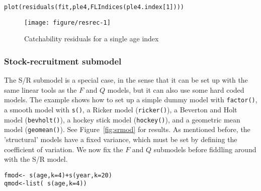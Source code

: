 \documentclass[a4paper,english,10pt]{article}\usepackage[]{graphicx}\usepackage[]{color}
\makeatletter
\def\maxwidth{ %
  \ifdim\Gin@nat@width>\linewidth
    \linewidth
  \else
    \Gin@nat@width
  \fi
}
\newcommand{\hlnum}[1]{\textcolor[rgb]{0.2,0.2,0.2}{#1}}%
\newcommand{\hlopt}[1]{\textcolor[rgb]{0.2,0.2,0.2}{#1}}%
\newcommand{\hlstd}[1]{\textcolor[rgb]{0,0,0}{#1}}%
\newcommand{\hlkwb}[1]{\textcolor[rgb]{0.361,0.506,0.596}{#1}}%
\newcommand{\hlkwc}[1]{\textcolor[rgb]{0.361,0.506,0.596}{#1}}%
\newcommand{\hlkwd}[1]{\textcolor[rgb]{0.361,0.506,0.596}{#1}}%
\newenvironment{kframe}{%
 \def\at@end@of@kframe{}%
 \ifinner\ifhmode%
  \def\at@end@of@kframe{\end{minipage}}%
  \begin{minipage}{\columnwidth}%
 \fi\fi%
 \def\FrameCommand##1{\hskip\@totalleftmargin \hskip-\fboxsep
 \colorbox{shadecolor}{##1}\hskip-\fboxsep
     \hskip-\linewidth \hskip-\@totalleftmargin \hskip\columnwidth}%
 \MakeFramed {\advance\hsize-\width
   \@totalleftmargin\z@ \linewidth\hsize
   \@setminipage}}%
 {\par\unskip\endMakeFramed%
 \at@end@of@kframe}
\newenvironment{knitrout}{}{} %
\newcommand{\code}[1]{{\texttt{#1}}}
\makeatother
\begin{document}
\begin{knitrout}
\color{fgcolor}\begin{kframe}
\begin{alltt}
\hlkwd{plot}\hlstd{(}\hlkwd{residuals}\hlstd{(fit, ple4,} \hlkwd{FLIndices}\hlstd{(ple4.index[}\hlnum{1}\hlstd{])))}
\end{alltt}
\end{kframe}\begin{figure}[H]

{\centering \texttt{[image: figure/resrec-1]} 

}

\caption[Catchability residuals for a single age index]{Catchability residuals for a single age index\label{fig:resrec}}
\end{figure}


\end{knitrout}

\subsubsection{Stock-recruitment submodel}

The S/R submodel is a special case, in the sense that it can be set up with the same linear tools as the $F$ and $Q$ models, but it can also use some hard coded models. The example shows how to set up a simple dummy model with \code{factor()}, a smooth model with \code{s()}, a Ricker model (\code{ricker()}), a Beverton and Holt model (\code{bevholt()}), a hockey stick model (\code{hockey()}), and a geometric mean model (\code{geomean()}). See Figure~\ref{fig:srmod} for results. As mentioned before, the 'structural' models have a fixed variance, which must be set by defining the coefficient of variation. We now fix the $F$ and $Q$ submodels before fiddling around with the S/R model.

\begin{knitrout}
\color{fgcolor}\begin{kframe}
\begin{alltt}
\hlstd{fmod} \hlkwb{<-} \hlopt{~} \hlkwd{s}\hlstd{(age,} \hlkwc{k}\hlstd{=}\hlnum{4}\hlstd{)} \hlopt{+} \hlkwd{s}\hlstd{(year,} \hlkwc{k} \hlstd{=} \hlnum{20}\hlstd{)}
\hlstd{qmod} \hlkwb{<-} \hlkwd{list}\hlstd{(}\hlopt{~} \hlkwd{s}\hlstd{(age,} \hlkwc{k}\hlstd{=}\hlnum{4}\hlstd{))}
\end{alltt}
\end{kframe}
\end{knitrout}
\end{document}
